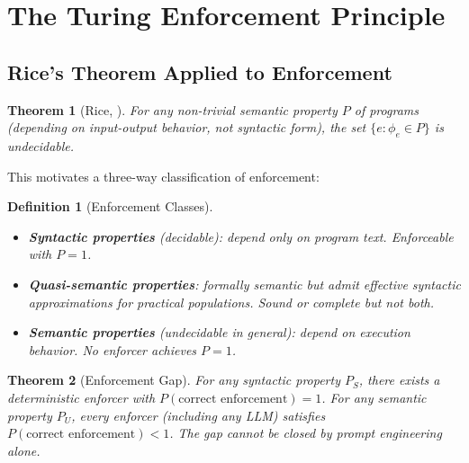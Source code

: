 \documentclass[11pt, a4paper, copyright]{googledeepmind}
\newtheorem{definition}{Definition}[section]
\newtheorem{theorem}{Theorem}[section]
\begin{document}
\section{The Turing Enforcement Principle}
\label{sec:turing}

\subsection{Rice's Theorem Applied to Enforcement}

\begin{theorem}[Rice, \citeyear{rice1953}]
For any non-trivial semantic property $P$ of programs (depending on input-output behavior, not syntactic form), the set $\{e : \phi_e \in P\}$ is undecidable.
\end{theorem}

This motivates a three-way classification of enforcement:

\begin{definition}[Enforcement Classes]
~
\begin{itemize}
\item \textbf{Syntactic properties} (decidable): depend only on program text. Enforceable with $P = 1$.
\item \textbf{Quasi-semantic properties}: formally semantic but admit effective syntactic approximations for practical populations. Sound or complete but not both.
\item \textbf{Semantic properties} (undecidable in general): depend on execution behavior. No enforcer achieves $P = 1$.
\end{itemize}
\end{definition}

\begin{theorem}[Enforcement Gap]
\label{thm:gap}
For any syntactic property $P_S$, there exists a deterministic enforcer with $P(\text{correct enforcement}) = 1$. For any semantic property $P_U$, every enforcer (including any LLM) satisfies $P(\text{correct enforcement}) < 1$. The gap cannot be closed by prompt engineering alone.
\end{theorem}
\end{document}
